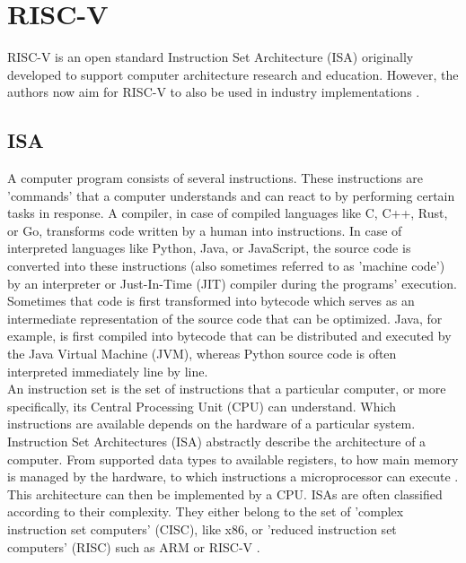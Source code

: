 
\section{RISC-V}

RISC-V \cite{riscv} is an open standard Instruction Set Architecture (ISA)
originally developed to support computer architecture research and education.
However, the authors now aim for RISC-V to also be used in industry implementations \cite[Cha 1]{riscv_spec}.

\subsection{ISA}

A computer program consists of several instructions.
These instructions are 'commands' that a computer understands and can react to by performing certain tasks in response.
A compiler, in case of compiled languages like C, C++, Rust, or Go, transforms code written by a human into instructions.
In case of interpreted languages like Python, Java, or JavaScript, the source code is converted into these instructions
(also sometimes referred to as 'machine code') by an interpreter or Just-In-Time (JIT) compiler during the programs' execution.
Sometimes that code is first transformed into bytecode which serves as an intermediate representation of the source code
that can be optimized.
Java, for example, is first compiled into bytecode that can be distributed and executed by the Java Virtual Machine (JVM),
whereas Python source code is often interpreted immediately line by line.
\\
An instruction set is the set of instructions that a particular computer, or more specifically,
its Central Processing Unit (CPU) can understand.
Which instructions are available depends on the hardware of a particular system.
Instruction Set Architectures (ISA) abstractly describe the architecture of a computer.
From supported data types to available registers, to how main memory is managed by the hardware, to
which instructions a microprocessor can execute \cite{isa}.
This architecture can then be implemented by a CPU.
ISAs are often classified according to their complexity.
They either belong to the set of 'complex instruction set computers' (CISC), like x86,
or 'reduced instruction set computers' (RISC) such as ARM \cite{arm_architecture} or RISC-V \cite{riscv_spec}.

